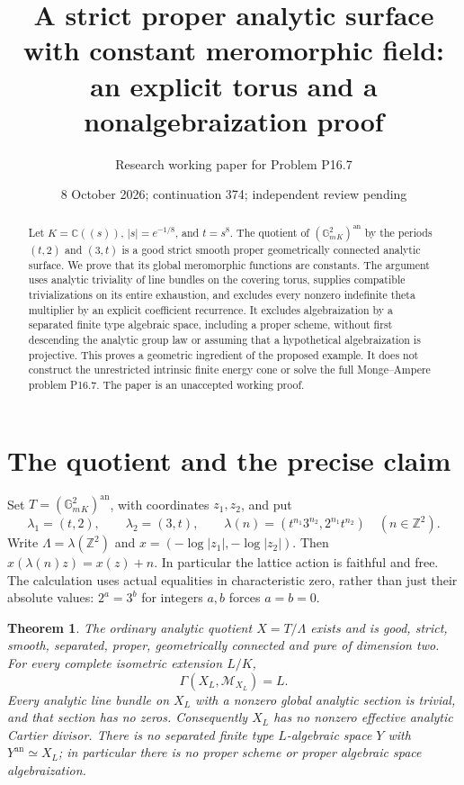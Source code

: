 \documentclass[11pt]{article}
\title{A strict proper analytic surface with constant meromorphic field:\\
an explicit torus and a nonalgebraization proof}
\author{Research working paper for Problem P16.7}
\date{8 October 2026; continuation 374; independent review pending}
\newtheorem{theorem}{Theorem}
\theoremstyle{remark}\newtheorem{remark}[theorem]{Remark}
\newcommand{\an}{\mathrm{an}}
\newcommand{\Gm}{\mathbb G_m}
\newcommand{\Z}{\mathbb Z}
\newcommand{\M}{\mathcal M}
\begin{document}
\maketitle
\begin{abstract}
Let $K=\mathbb C((s))$, $|s|=e^{-1/8}$, and $t=s^8$.
The quotient of $(\Gm^2_K)^{\an}$ by the periods $(t,2)$ and $(3,t)$
is a good strict smooth proper geometrically connected analytic surface.
We prove that its global meromorphic functions are constants. The argument
uses analytic triviality of line bundles on the covering torus, supplies
compatible trivializations on its entire exhaustion, and excludes every
nonzero indefinite theta multiplier by an explicit coefficient recurrence.
It excludes algebraization by a separated finite type algebraic space,
including a proper scheme, without first descending the analytic group law
or assuming that a hypothetical algebraization is projective.
This proves a geometric ingredient of the proposed example. It does not
construct the unrestricted intrinsic finite energy cone or solve the full
Monge--Ampere problem P16.7. The paper is an unaccepted working proof.
\end{abstract}

\section{The quotient and the precise claim}
Set $T=(\Gm^2_K)^{\an}$, with coordinates $z_1,z_2$, and put
\[
 \lambda_1=(t,2),\qquad\lambda_2=(3,t),\qquad
 \lambda(n)=(t^{n_1}3^{n_2},2^{n_1}t^{n_2})\quad(n\in\Z^2).
\]
Write $\Lambda=\lambda(\Z^2)$ and
$x=(-\log|z_1|,-\log|z_2|)$. Then $x(\lambda(n)z)=x(z)+n$.
In particular the lattice action is faithful and free. The calculation
uses actual equalities in characteristic zero, rather than just their
absolute values: $2^a=3^b$ for integers $a,b$ forces $a=b=0$.

\begin{theorem}\label{main}
The ordinary analytic quotient $X=T/\Lambda$ exists and is good, strict,
smooth, separated, proper, geometrically connected and pure of dimension two.
For every complete isometric extension $L/K$,
\[
 \Gamma(X_L,\M_{X_L})=L.
\]
Every analytic line bundle on $X_L$ with a nonzero global analytic section
is trivial, and that section has no zeros. Consequently $X_L$ has no
nonzero effective analytic Cartier divisor. There is no separated finite
type $L$-algebraic space $Y$ with $Y^{\an}\simeq X_L$; in particular there
is no proper scheme or proper algebraic space algebraization.
\end{theorem}
\end{document}
